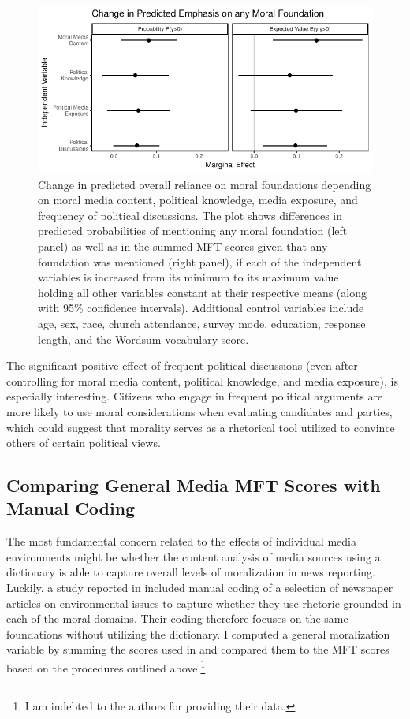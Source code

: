 \documentclass[12pt]{article}
\begin{document}
\begin{figure}[h]\centering
\includegraphics{../calc/fig/tobit_learn.pdf}
\caption{Change in predicted overall reliance on moral foundations depending on moral media content, political knowledge, media exposure, and frequency of political discussions. The plot shows differences in predicted probabilities of mentioning any moral foundation (left panel) as well as in the summed MFT scores given that any foundation was mentioned (right panel), if each of the independent variables is increased from its minimum to its maximum value holding all other variables constant at their respective means (along with 95\% confidence intervals). Additional control variables include age, sex, race, church attendance, survey mode, education, response length, and the Wordsum vocabulary score. 
}\label{fig:tobit_learn}
\end{figure}

The significant positive effect of frequent political discussions (even after controlling for moral media content, political knowledge, and media exposure), is especially interesting. Citizens who engage in frequent political arguments are more likely to use moral considerations when evaluating candidates and parties, which could suggest that morality serves as a rhetorical tool utilized to convince others of certain political views.


\clearpage
\subsection{Comparing General Media MFT Scores with Manual Coding}

The most fundamental concern related to the effects of individual media environments might be whether the content analysis of media sources using a dictionary is able to capture overall levels of moralization in news reporting. Luckily, a study reported in \citet{feinberg2013moral} included manual coding of a selection of newspaper articles on environmental issues to capture whether they use rhetoric grounded in each of the moral domains. Their coding therefore focuses on the same foundations without utilizing the dictionary. I computed a general moralization variable by summing the scores used in \citet{feinberg2013moral} and compared them to the MFT scores based on the procedures outlined above.\footnote{I am indebted to the authors for providing their data.}
\end{document}
